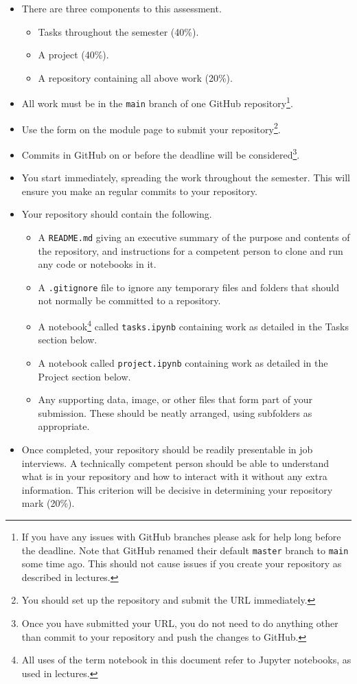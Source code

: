 \documentclass{iansnotes}
\begin{document}
\begin{itemize}
  \item There are three components to this assessment.
  \begin{itemize}
    \item Tasks throughout the semester (40\%).
    \item A project (40\%).
    \item A repository containing all above work (20\%).
  \end{itemize}
  \item All work must be in the \texttt{main} branch of one GitHub repository\footnote{If you have any issues with GitHub branches please ask for help long before the deadline. Note that GitHub renamed their default \texttt{master} branch to \texttt{main} some time ago. This should not cause issues if you create your repository as described in lectures.}.
  \item Use the form on the module page to submit your repository\footnote{You should set up the repository and submit the URL immediately.}.
  \item Commits in GitHub on or before the deadline will be considered\footnote{Once you have submitted your URL, you do not need to do anything other than commit to your repository and push the changes to GitHub.}.
  \item You start immediately, spreading the work throughout the semester. This will ensure you make an regular commits to your repository.
  \item Your repository should contain the following.
  \begin{itemize}
    \item A \texttt{README.md} giving an executive summary of the purpose and contents of the repository, and instructions for a competent person to clone and run any code or notebooks in it.
    \item A \texttt{.gitignore} file to ignore any temporary files and folders that should not normally be committed to a repository.
    \item A notebook\footnote{All uses of the term notebook in this document refer to Jupyter notebooks, as used in lectures.} called \texttt{tasks.ipynb} containing work as detailed in the Tasks section below.
    \item A notebook called \texttt{project.ipynb} containing work as detailed in the Project section below.
    \item Any supporting data, image, or other files that form part of your submission. These should be neatly arranged, using subfolders as appropriate.
  \end{itemize}
  \item Once completed, your repository should be readily presentable in job interviews. A technically competent person should be able to understand what is in your repository and how to interact with it without any extra information. This criterion will be decisive in determining your repository mark (20\%).
\end{itemize}
\end{document}
